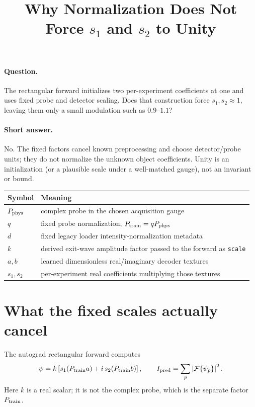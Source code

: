 \documentclass[10pt]{article}
\title{Why Normalization Does Not Force $s_1$ and $s_2$ to Unity}
\author{}
\date{}
\newcommand{\E}{\mathcal{F}}
\begin{document}
\maketitle
\vspace{-2.2em}

\paragraph{Question.}
The rectangular forward initializes two per-experiment coefficients at one and
uses fixed probe and detector scaling. Does that construction force
$s_1,s_2\approx1$, leaving them only a small modulation such as $0.9$--$1.1$?

\paragraph{Short answer.}
No. The fixed factors cancel known preprocessing and choose detector/probe
units; they do not normalize the unknown object coefficients. Unity is an
initialization (or a plausible scale under a well-matched gauge), not an
invariant or bound.

\begin{center}
\small
\begin{tabular}{@{}ll@{}}
\toprule
Symbol & Meaning \\
\midrule
$P_{\rm phys}$ & complex probe in the chosen acquisition gauge \\
$q$ & fixed probe normalization, $P_{\rm train}=qP_{\rm phys}$ \\
$d$ & fixed legacy loader intensity-normalization metadata \\
$k$ & derived exit-wave amplitude factor passed to the forward as \texttt{scale} \\
$a,b$ & learned dimensionless real/imaginary decoder textures \\
$s_1,s_2$ & per-experiment real coefficients multiplying those textures \\
\bottomrule
\end{tabular}
\end{center}

\section*{What the fixed scales actually cancel}

The autograd rectangular forward computes
\begin{equation}
  \psi = k\left[s_1(P_{\rm train}a)
           + i\,s_2(P_{\rm train}b)\right],
  \qquad
  I_{\rm pred}=\sum_p\left|\E\{\psi_p\}\right|^2 .
\end{equation}
Here $k$ is a real scalar; it is not the complex probe, which is the separate
factor $P_{\rm train}$.
\end{document}

